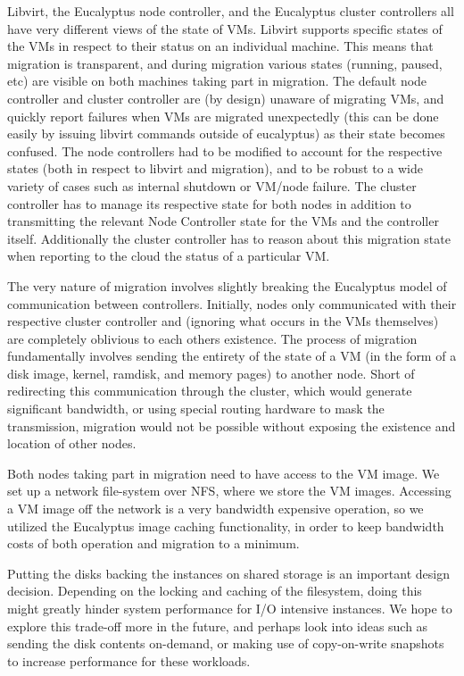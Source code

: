 Libvirt, the Eucalyptus node controller, and the Eucalyptus cluster controllers
all have very different views of the state of VMs.  Libvirt supports specific
states of the VMs in respect to their status on an individual machine. This
means that migration is transparent, and during migration various states
(running, paused, etc) are visible on both machines taking part in migration.
The default node controller and cluster controller are (by design) unaware of
migrating VMs, and quickly report failures when VMs are migrated unexpectedly
(this can be done easily by issuing libvirt commands outside of eucalyptus) as
their state becomes confused.  The node controllers had to be modified to
account for the respective states (both in respect to libvirt and migration),
and to be robust to a wide variety of cases such as internal shutdown or VM/node
failure.  The cluster controller has to manage its respective state for both
nodes in addition to transmitting the relevant Node Controller state for the VMs
and the controller itself.  Additionally the cluster controller has to reason
about this migration state when reporting to the cloud the status of a
particular VM.

The very nature of migration involves slightly breaking the Eucalyptus model of
communication between controllers.  Initially, nodes only communicated with
their respective cluster controller and (ignoring what occurs in the VMs
themselves) are completely oblivious to each others existence.  The process of
migration fundamentally involves sending the entirety of the state of a VM (in
the form of a disk image, kernel, ramdisk, and memory pages) to another node.
Short of redirecting this communication through the cluster, which would
generate significant bandwidth, or using special routing hardware to mask the
transmission, migration would not be possible without exposing the existence and
location of other nodes.

Both nodes taking part in migration need to have access to the VM image.  We set
up a network file-system over NFS, where we store the VM images.  Accessing a VM
image off the network is a very bandwidth expensive operation, so we utilized
the Eucalyptus image caching functionality, in order to keep bandwidth costs of
both operation and migration to a minimum.

Putting the disks backing the instances on shared storage is an important design
decision.  Depending on the locking and caching of the filesystem, doing this
might greatly hinder system performance for I/O intensive instances.  We hope to
explore this trade-off more in the future, and perhaps look into ideas such as
sending the disk contents on-demand, or making use of copy-on-write snapshots to
increase performance for these workloads.

